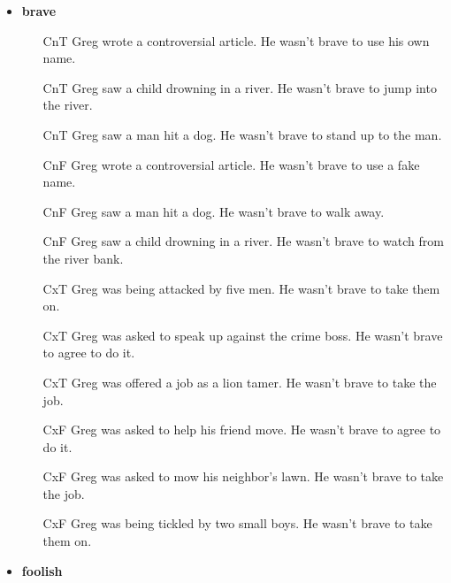 \documentclass[11pt,fleqn]{article}
\newcommand{\6}{\mbox{$[\hspace*{-.6mm}[$}}
\newcommand{\9}{\mbox{$]\hspace*{-.6mm}]$}}
\begin{document}
\begin{itemize}[itemsep=-1pt]

\item {\bf brave}

\begin{enumerate}[topsep=0pt,itemsep=-4pt]

\item[CnT] 	Greg wrote a controversial article.	He	wasn't brave	to use his own name.
\item[CnT] 	Greg saw a child drowning in a river.	He	wasn't brave	to jump into the river.
\item[CnT] 	Greg saw a man hit a dog.	He	wasn't brave	to stand up to the man.
\item[CnF] 	Greg wrote a controversial article.	He	wasn't brave	to use a fake name.
\item[CnF] 	Greg saw a man hit a dog.	He	wasn't brave	to walk away.
\item[CnF] 	Greg saw a child drowning in a river.	He	wasn't brave	to watch from the river bank.
\item[CxT] 	Greg was being attacked by five men.	He	wasn't brave	to take them on.
\item[CxT] 	Greg was asked to speak up against the crime boss.	He	wasn't brave	to agree to do it.
\item[CxT] 	Greg was offered a job as a lion tamer.	He	wasn't brave	to take the job.
\item[CxF] 	Greg was asked to help his friend move.	He	wasn't brave	to agree to do it.
\item[CxF] 	Greg was asked to mow his neighbor's lawn.	He	wasn't brave	to take the job.
\item[CxF] 	Greg was being tickled by two small boys.	He	wasn't brave	to take them on.

\end{enumerate}

\item {\bf foolish}

\begin{enumerate}[topsep=0pt,itemsep=-4pt]



\end{enumerate}
\end{itemize}
\end{document}
